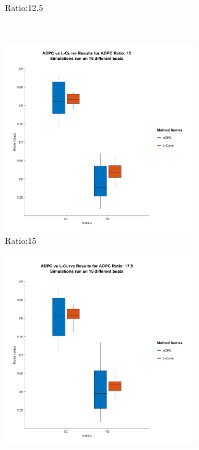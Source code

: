 \documentclass[draftcls, onecolumn, journal]{IEEEtran}
\begin{document}
\begin{figure}[h]
\begin{subfigure}[b]{0.48\linewidth}
    \caption{Ratio:12.5}\label{subfig:b}
    \end{subfigure}\\
    \begin{subfigure}[b]{0.32\textwidth}
        \centering
        \includegraphics[width=0.9\textwidth]{../images/ADPC_vs_L-Curve_Results_for_ADPC_Ratio_15.png}
        \caption{Ratio:15}\label{subfig:c}
        \end{subfigure}
        \begin{subfigure}[b]{0.32\linewidth}
        \centering
        \includegraphics[width=0.9\textwidth]{../images/ADPC_vs_L-Curve_Results_for_ADPC_Ratio_17_5.png}

\end{subfigure}
\end{figure}
\end{document}
